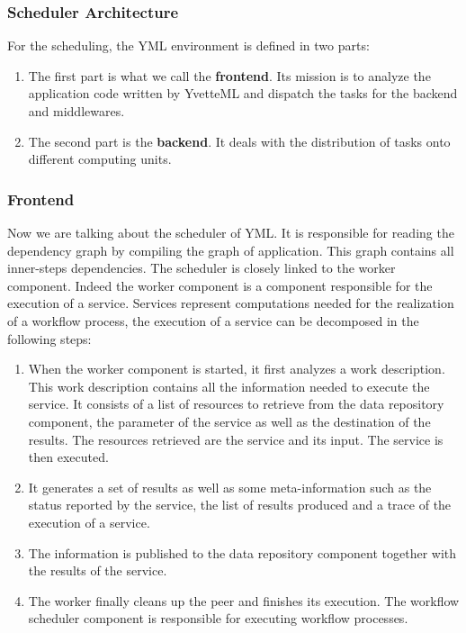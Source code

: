 \subsubsection{Scheduler Architecture}

For the scheduling, the YML environment is defined in two parts:

\begin{enumerate}[label=(\arabic*)]
	\item The first part is what we call the \textbf{frontend}. Its mission is to analyze the application code written by YvetteML and dispatch the tasks for the backend and middlewares.
	\item  The second part is the \textbf{backend}.  It deals  with the distribution of tasks onto different computing units.
\end{enumerate}

\subsubsection{Frontend}

Now we are talking about the scheduler of YML. It is responsible for reading the dependency graph by compiling the graph of application. This graph contains all inner-steps dependencies. The scheduler is closely linked to the worker component. Indeed the worker component is a component responsible for the execution of a service. Services represent computations needed for the realization of a workflow process, the execution of a service can be decomposed in the following steps: 

\begin{enumerate}[label=(\arabic*)]
	
	\item  When the worker component is started, it first analyzes a work description. This work description contains all the information needed to execute the service. It consists of a list of resources to retrieve from the data repository component, the parameter of the service as well as the destination of the results. The resources retrieved are the service and its input. The service is then executed. 
	
	\item  It generates a set of results as well as some meta-information such as the status reported by the service, the list of results produced and a trace of the execution of a service. 
	
	\item The information is published to the data repository component together with the results of the service. 
	
	\item  The worker finally cleans up the peer and finishes its execution. The workflow scheduler component is responsible for executing workflow processes. 
\end{enumerate}

